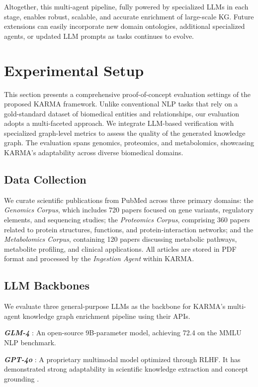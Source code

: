 \documentclass{article}
\begin{document}
Altogether, this multi-agent pipeline, fully powered by specialized LLMs in each stage, enables robust, scalable, and accurate enrichment of large-scale KG. Future extensions can easily incorporate new domain ontologies, additional specialized agents, or updated LLM prompts as tasks continues to evolve.

\section{Experimental Setup}
This section presents a comprehensive proof-of-concept evaluation settings of the proposed KARMA framework. Unlike conventional NLP tasks that rely on a gold-standard dataset of biomedical entities and relationships, our evaluation adopts a multi-faceted approach. We integrate LLM-based verification with specialized graph-level metrics to assess the quality of the generated knowledge graph. The evaluation spans genomics, proteomics, and metabolomics, showcasing KARMA’s adaptability across diverse biomedical domains.

\subsection{Data Collection}
We curate scientific publications from PubMed \cite{white2020pubmed} across three primary domains: the \emph{Genomics Corpus}, which includes 720 papers focused on gene variants, regulatory elements, and sequencing studies; the \emph{Proteomics Corpus}, comprising 360 papers related to protein structures, functions, and protein-interaction networks; and the \emph{Metabolomics Corpus}, containing 120 papers discussing metabolic pathways, metabolite profiling, and clinical applications. All articles are stored in PDF format and processed by the \emph{Ingestion Agent} within KARMA.

\subsection{LLM Backbones}
We evaluate three general-purpose LLMs as the backbone for KARMA’s multi-agent knowledge graph enrichment pipeline using their APIs.

\textbf{\emph{GLM-4}} \cite{glm2024chatglm}: An open-source 9B-parameter model, achieving 72.4 on the MMLU NLP benchmark.

\textbf{\emph{GPT-4o}} \cite{achiam2023gpt}: A proprietary multimodal model optimized through RLHF. It has demonstrated strong adaptability in scientific knowledge extraction and concept grounding \cite{dagdelen2024structured}.
\end{document}
